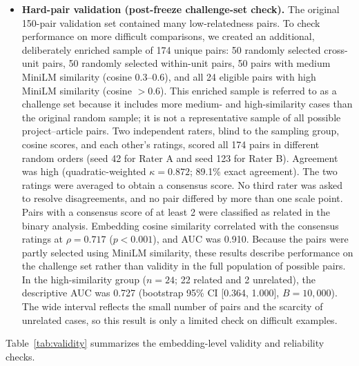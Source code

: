 \documentclass[pdflatex,sn-apa]{sn-jnl}
\begin{document}
\begin{itemize}
\item \textbf{Hard-pair validation (post-freeze challenge-set check).} The original 150-pair validation set contained many low-relatedness pairs. To check performance on more difficult comparisons, we created an additional, deliberately enriched sample of 174 unique pairs: 50 randomly selected cross-unit pairs, 50 randomly selected within-unit pairs, 50 pairs with medium MiniLM similarity (cosine 0.3--0.6), and all 24 eligible pairs with high MiniLM similarity (cosine $>0.6$). This enriched sample is referred to as a challenge set because it includes more medium- and high-similarity cases than the original random sample; it is not a representative sample of all possible project--article pairs. Two independent raters, blind to the sampling group, cosine scores, and each other's ratings, scored all 174 pairs in different random orders (seed 42 for Rater A and seed 123 for Rater B). Agreement was high (quadratic-weighted $\kappa=0.872$; 89.1\% exact agreement). The two ratings were averaged to obtain a consensus score. No third rater was asked to resolve disagreements, and no pair differed by more than one scale point. Pairs with a consensus score of at least 2 were classified as related in the binary analysis. Embedding cosine similarity correlated with the consensus ratings at $\rho=0.717$ ($p<0.001$), and AUC was 0.910. Because the pairs were partly selected using MiniLM similarity, these results describe performance on the challenge set rather than validity in the full population of possible pairs. In the high-similarity group ($n=24$; 22 related and 2 unrelated), the descriptive AUC was 0.727 (bootstrap 95\% CI [0.364, 1.000], $B=10{,}000$). The wide interval reflects the small number of pairs and the scarcity of unrelated cases, so this result is only a limited check on difficult examples.
\end{itemize}

Table~\ref{tab:validity} summarizes the embedding-level validity and reliability checks.
\end{document}
